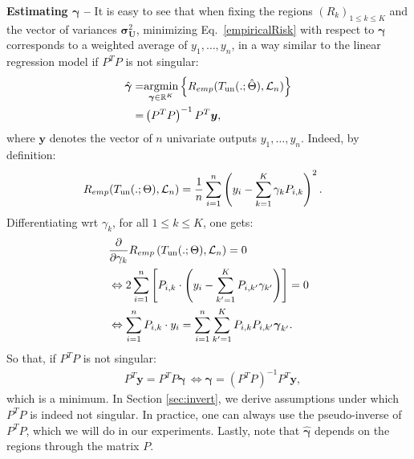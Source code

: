 \noindent \textbf{Estimating $\boldsymbol{\gamma}$ --} It is easy to see that when fixing the regions $(R_k)_{1\leq k \leq K}$ and the vector of variances $\boldsymbol{\sigma}_{\boldsymbol{U}}^2 $, minimizing Eq.~\eqref{empiricalRisk} with respect to $\boldsymbol{\gamma}$ corresponds to a weighted average of $y_1,\ldots, y_n$, in a way similar to the linear regression model if $P^T P$ is not singular:
%
\begin{align}
    \label{notre_estimateur_gamma_k}
       \hat{\boldsymbol{\gamma}} =& \underset{\boldsymbol{\gamma} \in \mathbb{R}^K}{\operatorname{argmin}} \left\{ R_{emp}(T_{\text{un}}(.;\hat{\Theta}), {\cal L}_n) \right\} \\
       =& \left(P^T P\right)^{-1}  P^T  \boldsymbol{y},\nonumber  
\end{align}
%
where $\boldsymbol{y}$ denotes the vector of $n$ univariate outputs $y_1,\ldots, y_n$.
Indeed, by definition:
%
\begin{align*}
    &R_{emp}(T_{\text{un}}(.;{\Theta}), {\cal L}_n)
    = 
    \frac{1}{n} \sum_{i=1}^n \left(y_i - \sum_{k=1}^K \gamma_k {P}_{i,k}\right)^2.
\end{align*}
%    
Differentiating wrt $\gamma_k$, for all $1\leq k \leq K$, one gets:
%
\begin{align*}
   &\frac{\partial}{\partial{\gamma}_{k}} R_{emp}\left( T_{\text{un}}(.;{\Theta}), {\cal L}_n\right) = 0 \\
    &\Leftrightarrow
   2 \sum_{i=1}^n \left[    
    P_{i,k} \cdot \left( y_i -  \sum_{k'=1}^K  P_{i,k'}  {\gamma}_{k'} \right)\right] = 0\\
   & \Leftrightarrow
   \sum_{i=1}^n 
        P_{i,k} \cdot   y_i
       =   \sum_{i=1}^n   \sum_{k'=1}^K    P_{i,k}  P_{i,k'}  \boldsymbol{\gamma}_{k'}.
\end{align*}
%
So that, if ${P}^T P$ is not singular:
%
\begin{align*}
& P^T   \boldsymbol{y}
       =  {P}^T   P\boldsymbol{\gamma} \, \Leftrightarrow \boldsymbol{\gamma} = \left(P^T P\right)^{-1}  P^T  \boldsymbol{y},
\end{align*}
which is a minimum. In Section \ref{sec:invert}, we derive assumptions under which ${P}^T P$ is indeed not singular. In practice, one can always use the pseudo-inverse of ${P}^T P$, which we will do in our experiments. Lastly, note that $\hat{\boldsymbol{\gamma}}$ depends on the regions through the matrix $P$. 

